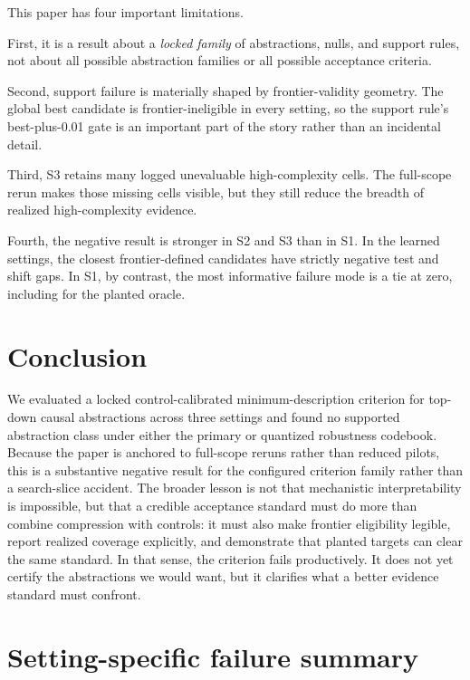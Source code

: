 \documentclass[10pt]{article}
\begin{document}
This paper has four important limitations.

First, it is a result about a \emph{locked family} of abstractions, nulls, and support rules, not about all possible abstraction families or all possible acceptance criteria.

Second, support failure is materially shaped by frontier-validity geometry. The global best candidate is frontier-ineligible in every setting, so the support rule's best-plus-0.01 gate is an important part of the story rather than an incidental detail.

Third, S3 retains many logged unevaluable high-complexity cells. The full-scope rerun makes those missing cells visible, but they still reduce the breadth of realized high-complexity evidence.

Fourth, the negative result is stronger in S2 and S3 than in S1. In the learned settings, the closest frontier-defined candidates have strictly negative test and shift gaps. In S1, by contrast, the most informative failure mode is a tie at zero, including for the planted oracle.

\section{Conclusion}

We evaluated a locked control-calibrated minimum-description criterion for top-down causal abstractions across three settings and found no supported abstraction class under either the primary or quantized robustness codebook. Because the paper is anchored to full-scope reruns rather than reduced pilots, this is a substantive negative result for the configured criterion family rather than a search-slice accident. The broader lesson is not that mechanistic interpretability is impossible, but that a credible acceptance standard must do more than combine compression with controls: it must also make frontier eligibility legible, report realized coverage explicitly, and demonstrate that planted targets can clear the same standard. In that sense, the criterion fails productively. It does not yet certify the abstractions we would want, but it clarifies what a better evidence standard must confront.




\appendix

\section{Setting-specific failure summary}
\end{document}
